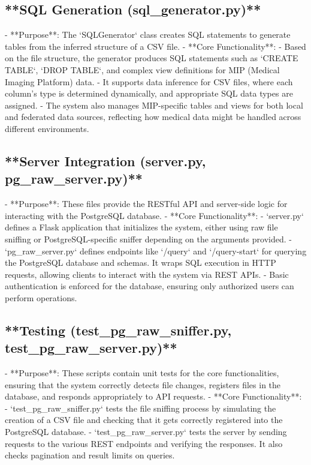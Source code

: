 \documentclass[sigconf,natbib=false]{acmart}
\begin{document}
\begin{draft}
 
\subsection{**SQL Generation (sql_generator.py)**}
   - **Purpose**: The `SQLGenerator` class creates SQL statements to generate tables from the inferred structure of a CSV file. 
   - **Core Functionality**:
     - Based on the file structure, the generator produces SQL statements such as `CREATE TABLE`, `DROP TABLE`, and complex view definitions for MIP (Medical Imaging Platform) data.
     - It supports data inference for CSV files, where each column's type is determined dynamically, and appropriate SQL data types are assigned.
     - The system also manages MIP-specific tables and views for both local and federated data sources, reflecting how medical data might be handled across different environments.

 
\subsection{**Server Integration (server.py, pg_raw_server.py)**}
   - **Purpose**: These files provide the RESTful API and server-side logic for interacting with the PostgreSQL database. 
   - **Core Functionality**:
     - `server.py` defines a Flask application that initializes the system, either using raw file sniffing or PostgreSQL-specific sniffer depending on the arguments provided.
     - `pg_raw_server.py` defines endpoints like `/query` and `/query-start` for querying the PostgreSQL database and schemas. It wraps SQL execution in HTTP requests, allowing clients to interact with the system via REST APIs.
     - Basic authentication is enforced for the database, ensuring only authorized users can perform operations.

\subsection{ **Testing (test_pg_raw_sniffer.py, test_pg_raw_server.py)**}
   - **Purpose**: These scripts contain unit tests for the core functionalities, ensuring that the system correctly detects file changes, registers files in the database, and responds appropriately to API requests.
   - **Core Functionality**:
     - `test_pg_raw_sniffer.py` tests the file sniffing process by simulating the creation of a CSV file and checking that it gets correctly registered into the PostgreSQL database.
     - `test_pg_raw_server.py` tests the server by sending requests to the various REST endpoints and verifying the responses. It also checks pagination and result limits on queries.


\end{draft}
\end{document}
